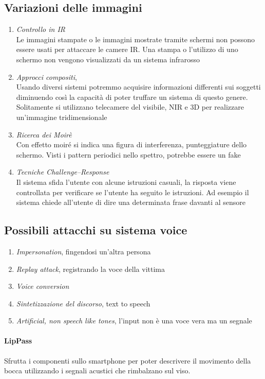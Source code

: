 \subsection{Variazioni delle immagini}
\begin{enumerate}
    \item \textit{Controllo in IR}\\
    Le immagini stampate o le immagini mostrate tramite schermi non possono essere usati per attaccare le camere IR. Una stampa o l’utilizzo di uno schermo non vengono visualizzati da un sistema infrarosso
    \item \textit{Approcci compositi},\\
    Usando diversi sistemi potremmo acquisire informazioni differenti sui soggetti diminuendo così la capacità di poter truffare un sistema di questo genere. Solitamente si utilizzano telecamere del visibile, NIR e 3D per realizzare un’immagine tridimensionale
    \item \textit{Ricerca dei Moirè}\\
    Con effetto moiré si indica una figura di interferenza, punteggiature dello schermo.
    Visti i pattern periodici nello spettro, potrebbe essere un fake
    \item \textit{Tecniche Challenge–Response}\\
    Il sistema sfida l’utente con alcune istruzioni casuali, la risposta viene controllata per verificare se l’utente ha seguito le istruzioni. Ad esempio il sistema chiede all’utente di dire una determinata frase davanti al sensore
\end{enumerate}

\subsection{Possibili attacchi su sistema voice}
\begin{enumerate}
    \item \textit{Impersonation}, fingendosi un'altra persona
    \item \textit{Replay attack}, registrando la voce della vittima
    \item \textit{Voice conversion}
    \item \textit{Sintetizzazione del discorso}, text to speech
    \item \textit{Artificial, non speech like tones}, l’input non è una voce vera ma un segnale
\end{enumerate}

\paragraph{LipPass}
Sfrutta i componenti sullo smartphone per poter descrivere il movimento della bocca utilizzando i segnali acustici che rimbalzano sul viso.

\newpage